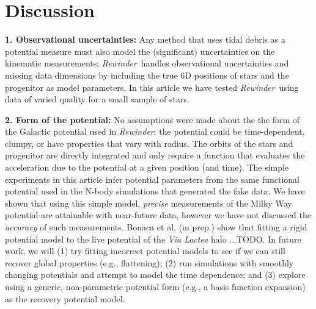 \documentclass[letterpaper,12pt,preprint]{aastex}
\newcommand{\project}[1]{\textsl{#1}}
\newcommand{\rewinder}{\emph{Rewinder}}
\begin{document}
%
%

\section{Discussion}\label{sec:discussion}

{\bf 1. Observational uncertainties:} Any method that uses tidal debris as a potential measure must also model the (significant) uncertainties on the kinematic measurements; \rewinder\ handles observational uncertainties and missing data dimensions by including the true 6D positions of stars and the progenitor as model parameters. In this article we have tested \rewinder\ using data of varied quality for a small sample of stars. 

{\bf 2. Form of the potential:} No assumptions were made about the the form of the Galactic potential used in \rewinder: the potential could be time-dependent, clumpy, or have properties that vary with radius. The orbits of the stars and progenitor are directly integrated and only require a function that evaluates the acceleration due to the potential at a given position (and time). The simple experiments in this article infer potential parameters from the same functional potential used in the N-body simulations that generated the fake data. We have shown that using this simple model, \emph{precise} measurements of the Milky Way potential are attainable with near-future data, however we have not discussed the \emph{accuracy} of such measurements. Bonaca et al. (in prep.) show that fitting a rigid potential model to the live potential of the \project{Via Lactea} halo ...TODO. In future work, we will (1) try fitting incorrect potential models to see if we can still recover global properties (e.g., flattening); (2) run simulations with smoothly changing potentials \citep[e.g.,][]{buist14} and attempt to model the time dependence; and (3) explore using a generic, non-parametric potential form (e.g., a basis function expansion) as the recovery potential model. 
\end{document}
